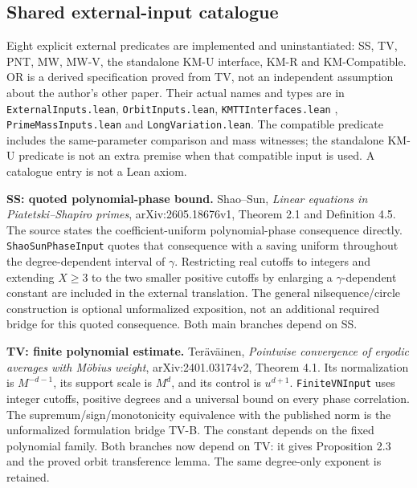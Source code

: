 \subsection*{Shared external-input catalogue}
Eight explicit external predicates are implemented and uninstantiated: SS, TV, PNT, MW, MW-V, the standalone KM-U interface, KM-R and KM-Compatible. OR is a derived specification proved from TV, not an independent assumption about the author's other paper. Their actual names and types are in \texttt{ExternalInputs.lean}, \texttt{OrbitInputs.lean}, \texttt{KMTTInterfaces.lean} , \texttt{PrimeMassInputs.lean} and \texttt{LongVariation.lean}. The compatible predicate includes the same-parameter comparison and mass witnesses; the standalone KM-U predicate is not an extra premise when that compatible input is used. A catalogue entry is not a Lean axiom.

\ifDetailed
\textbf{SS: quoted polynomial-phase bound.} Shao--Sun, \emph{Linear equations in Piatetski--Shapiro primes}, arXiv:2605.18676v1, Theorem 2.1 and Definition 4.5. The source states the coefficient-uniform polynomial-phase consequence directly. \texttt{ShaoSunPhaseInput} quotes that consequence with a saving uniform throughout the degree-dependent interval of $\gamma$. Restricting real cutoffs to integers and extending $X\geq3$ to the two smaller positive cutoffs by enlarging a $\gamma$-dependent constant are included in the external translation. The general nilsequence/circle construction is optional unformalized exposition, not an additional required bridge for this quoted consequence. Both main branches depend on SS.

\textbf{TV: finite polynomial estimate.} Ter\"av\"ainen, \emph{Pointwise convergence of ergodic averages with M\"obius weight}, arXiv:2401.03174v2, Theorem 4.1. Its normalization is $M^{-d-1}$, its support scale is $M^d$, and its control is $u^{d+1}$. \texttt{FiniteVNInput} uses integer cutoffs, positive degrees and a universal bound on every phase correlation. The supremum/sign/monotonicity equivalence with the published norm is the unformalized formulation bridge TV-B. The constant depends on the fixed polynomial family. Both branches now depend on TV: it gives Proposition 2.3 and the proved orbit transference lemma. The same degree-only exponent is retained.

